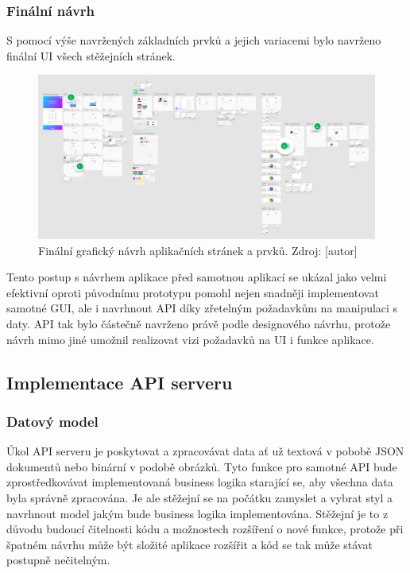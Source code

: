 		\subsubsection{Finální návrh}

		S pomocí výše navržených základních prvků a jejich variacemi bylo navrženo finální \ac{UI} všech stěžejních
		stránek.

		\begin{figure}[H]
			\centering
			\includegraphics[width=\linewidth]{obrazky/finalni_navrh}\hfill
			\caption{Finální grafický návrh aplikačních stránek a prvků. Zdroj: [autor]}
		\end{figure}

		Tento postup s návrhem aplikace před samotnou aplikací se ukázal jako velmi efektivní oproti původnímu prototypu
		pomohl nejen snadněji implementovat samotné \ac{GUI}, ale i navrhnout \ac{API} díky zřetelným požadavkům na
		manipulaci s daty.
		\ac{API} tak bylo částečně navrženo právě podle designového návrhu, protože návrh mimo jiné umožnil realizovat
		vizi požadavků na \ac{UI} i funkce aplikace.

	\subsection{Implementace API serveru}

		\subsubsection{Datový model}

		Úkol API serveru je poskytovat a zpracovávat data ať už textová v pobobě \ac{JSON} dokumentů nebo binární v podobě
		obrázků.
		Tyto funkce pro samotné API bude zprostředkovávat implementovaná business logika starající se, aby všechna data
		byla správně zpracována.
		Je ale stěžejní se na počátku zamyslet a vybrat styl a navrhnout model jakým bude business logika implementována.
		Stěžejní je to z důvodu budoucí čitelnosti kódu a možnostech rozšíření o nové funkce, protože při špatném
		návrhu může být složité aplikace rozšířit a kód se tak může stávat postupně nečitelným.

